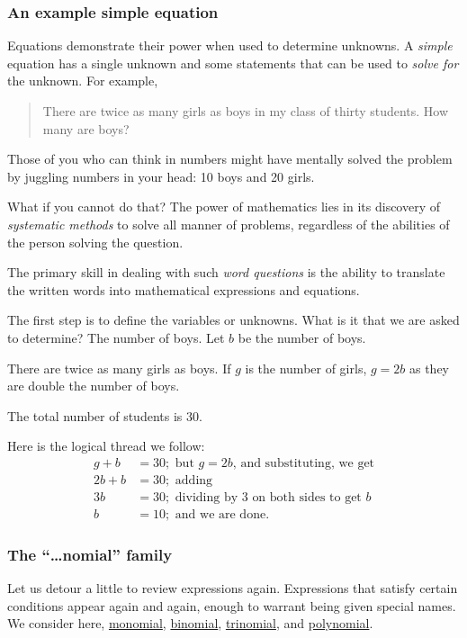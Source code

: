 \documentclass[
  a4paper,
]{article}
\begin{document}
\subsubsection{An example simple
equation}\label{an-example-simple-equation}

Equations demonstrate their power when used to determine unknowns. A
\emph{simple} equation has a single unknown and some statements that can
be used to \emph{solve for} the unknown. For example,

\begin{quote}
There are twice as many girls as boys in my class of thirty students.
How many are boys?
\end{quote}

Those of you who can think in numbers might have mentally solved the
problem by juggling numbers in your head: 10 boys and 20 girls.

What if you cannot do that? The power of mathematics lies in its
discovery of \emph{systematic methods} to solve all manner of problems,
regardless of the abilities of the person solving the question.

The primary skill in dealing with such \emph{word questions} is the
ability to translate the written words into mathematical expressions and
equations.

The first step is to define the variables or unknowns. What is it that
we are asked to determine? The number of boys. Let \(b\) be the number
of boys.

There are twice as many girls as boys. If \(g\) is the number of girls,
\(g = 2b\) as they are double the number of boys.

The total number of students is \(30\).

Here is the logical thread we follow: \[
\begin{aligned}
g + b &= 30; \text{ but $g = 2b$, and substituting, we get}\\
2b + b &= 30; \text{ adding}\\
3b &= 30; \text{ dividing by $3$ on both sides to get $b$}\\
b &= 10; \text{ and we are done.} 
\end{aligned}
\]

\subsubsection{The ``\ldots nomial'' family}\label{the-nomial-family}

Let us detour a little to review expressions again. Expressions that
satisfy certain conditions appear again and again, enough to warrant
being given special names. We consider here,
\href{https://en.wikipedia.org/wiki/Monomial}{monomial},
\href{https://en.wikipedia.org/wiki/Binomial_(polynomial)}{binomial},
\href{https://en.wikipedia.org/wiki/Trinomial}{trinomial}, and
\href{https://en.wikipedia.org/wiki/Polynomial}{polynomial}.
\end{document}
